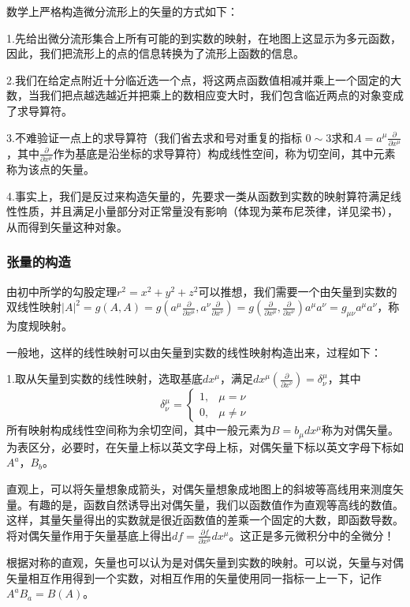 \documentclass{article}
\begin{document}
数学上严格构造微分流形上的矢量的方式如下：

1.先给出微分流形集合上所有可能的到实数的映射，在地图上这显示为多元函数，因此，我们把流形上的点的信息转换为了流形上函数的信息。

2.我们在给定点附近十分临近选一个点，将这两点函数值相减并乘上一个固定的大数，当我们把点越选越近并把乘上的数相应变大时，我们包含临近两点的对象变成了求导算符。

3.不难验证一点上的求导算符（我们省去求和号对重复的指标 $ 0 \sim 3 $求和$A=a^\mu \frac{\partial}{\partial x^\mu }$，其中$\frac{\partial}{\partial x^\mu }$作为基底是沿坐标的求导算符）构成线性空间，称为切空间，其中元素称为该点的矢量。

4.事实上，我们是反过来构造矢量的，先要求一类从函数到实数的映射算符满足线性性质，并且满足小量部分对正常量没有影响（体现为莱布尼茨律，详见梁书），从而得到矢量这种对象。

\subsubsection{张量的构造}
由初中所学的勾股定理$r^2=x^2+y^2+z^2$可以推想，我们需要一个由矢量到实数的双线性映射$|A|^2=g(A,A)=g(a^\mu \frac{\partial}{\partial x^\mu },a^\nu \frac{\partial}{\partial x^\nu })=g( \frac{\partial}{\partial x^\mu }, \frac{\partial}{\partial x^\nu})a^\mu a^\nu=g_{\mu \nu }a^\mu a^\nu $，称为度规映射。

一般地，这样的线性映射可以由矢量到实数的线性映射构造出来，过程如下：

1.取从矢量到实数的线性映射，选取基底$dx^\mu $，满足$dx^\mu (\frac{\partial}{\partial x^\nu })=\delta ^\mu _\nu$，其中
\begin{equation*}
    \delta ^\mu _\nu =
    \begin{cases}
    1,&\mu=\nu
    \\0,&\mu\neq \nu
\end{cases}
\end{equation*}
所有映射构成线性空间称为余切空间，其中一般元素为$B=b_\mu dx^\mu $称为对偶矢量。为表区分，必要时，在矢量上标以英文字母上标，对偶矢量下标以英文字母下标如$A^a$，$B_b$。

直观上，可以将矢量想象成箭头，对偶矢量想象成地图上的斜坡等高线用来测度矢量。有趣的是，函数自然诱导出对偶矢量，我们以函数值作为直观等高线的数值。这样，其量矢量得出的实数就是很近函数值的差乘一个固定的大数，即函数导数。将对偶矢量作用于矢量基底上得出$df=\frac{\partial f}{\partial x^\mu }dx^\mu $。这正是多元微积分中的全微分！

根据对称的直观，矢量也可以认为是对偶矢量到实数的映射。可以说，矢量与对偶矢量相互作用得到一个实数，对相互作用的矢量使用同一指标一上一下，记作$A^a B_a=B(A)$。
\end{document}
